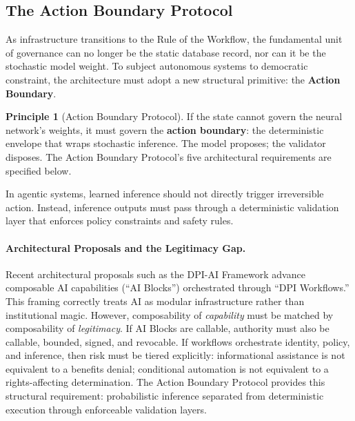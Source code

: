 \documentclass{article}
\theoremstyle{definition}
\newtheorem{principle}{Principle}[section]
\begin{document}
\subsection{The Action Boundary Protocol}
\label{subsec:action-boundary}

As infrastructure transitions to the Rule of the Workflow, the fundamental unit of governance can no longer be the static database record, nor can it be the stochastic model weight. To subject autonomous systems to democratic constraint, the architecture must adopt a new structural primitive: the \textbf{Action Boundary}.

\begin{principle}[Action Boundary Protocol]
If the state cannot govern the neural network's weights, it must govern the \textbf{action boundary}: the deterministic envelope that wraps stochastic inference. The model proposes; the validator disposes. The Action Boundary Protocol's five architectural requirements are specified below.
\end{principle}

In agentic systems, learned inference should not directly trigger irreversible action. Instead, inference outputs must pass through a deterministic validation layer that enforces policy constraints and safety rules.

\paragraph{Architectural Proposals and the Legitimacy Gap.} Recent architectural proposals such as the DPI-AI Framework \citep{abadie2026} advance composable AI capabilities (``AI Blocks'') orchestrated through ``DPI Workflows.'' This framing correctly treats AI as modular infrastructure rather than institutional magic. However, composability of \textit{capability} must be matched by composability of \textit{legitimacy}. If AI Blocks are callable, authority must also be callable, bounded, signed, and revocable. If workflows orchestrate identity, policy, and inference, then risk must be tiered explicitly: informational assistance is not equivalent to a benefits denial; conditional automation is not equivalent to a rights-affecting determination. The Action Boundary Protocol provides this structural requirement: probabilistic inference separated from deterministic execution through enforceable validation layers.
\end{document}
